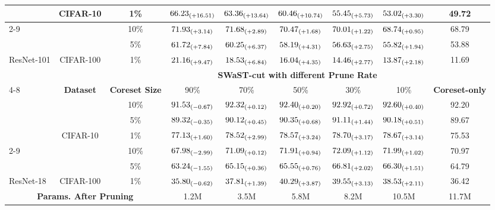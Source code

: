 \begin{table}[!t]
{\begin{tabular}{lcccccccc}
    \multicolumn{1}{c}{} & \multirow{-3}{*}{CIFAR-10} & 1\% & {\color{red}$66.23_{{\tiny(+16.51)}}$} & {\color{blue}$63.36_{{\tiny(+13.64)}}$} & {\color{blue}$60.46_{{\tiny(+10.74)}}$} & $55.45_{{\tiny(+5.73)}}$ & $53.02_{{\tiny(+3.30)}}$ & 49.72 \\ \cline{2-9}   
    \multicolumn{1}{c}{} &  & 10\% & {\color{red}$71.93_{{\tiny(+3.14)}}$} & {\color{blue}$71.68_{{\tiny(+2.89)}}$} & {\color{blue}$70.47_{{\tiny(+1.68)}}$} & $70.01_{{\tiny(+1.22)}}$ & $68.74_{{\tiny(+0.95)}}$ & 68.79 \\
    \multicolumn{1}{c}{} &  & 5\% & {\color{red}$61.72_{{\tiny(+7.84)}}$} & {\color{blue}$60.25_{{\tiny(+6.37)}}$} & {\color{blue}$58.19_{{\tiny(+4.31)}}$} & $56.63_{{\tiny(+2.75)}}$ & $55.82_{{\tiny(+1.94)}}$ & 53.88 \\
    \multirow{-6}{*}{ResNet-101} & \multirow{-3}{*}{CIFAR-100} & 1\% & {\color{red}$21.16_{{\tiny(+9.47)}}$} & {\color{blue}$18.53_{{\tiny(+6.84)}}$} & {\color{blue}\textbf{$16.04_{{\tiny(+4.35)}}$}} & $14.46_{{\tiny(+2.77)}}$ & $13.87_{{\tiny(+2.18)}}$ & 11.69 \\ \hline
    &  &  & \multicolumn{5}{c}{\textbf{SWaST-cut with different Prune Rate}} &  \\ \cline{4-8}  
    \multirow{-2}{*}{\textbf{Model}} & \multirow{-2}{*}{\textbf{Dataset}} & \multirow{-2}{*}{\textbf{Coreset Size}} & 90\% & 70\% & 50\% & 30\% & 10\% & \multirow{-2}{*}{\textbf{Coreset-only}} \\ \hline  
    &  & 10\% & $91.53_{{\tiny(-0.67)}}$ & $92.32_{{\tiny(+0.12)}}$ & {\color{blue}$92.40_{{\tiny(+0.20)}}$} & {\color{red}\textbf{$92.92_{{\tiny(+0.72)}}$}} & {\color{blue}$92.60_{{\tiny(+0.40)}}$} & 92.20 \\
    &  & 5\% & $89.32_{{\tiny(-0.35)}}$ & $90.12_{{\tiny(+0.45)}}$ & {\color{blue}\textbf{$90.35_{{\tiny(+0.68)}}$}} & {\color{red}$91.11_{{\tiny(+1.44)}}$} & {\color{blue}$90.18_{{\tiny(+0.51)}}$} & 89.67 \\
    & \multirow{-3}{*}{CIFAR-10} & 1\% & $77.13_{{\tiny(+1.60)}}$ & $78.52_{{\tiny(+2.99)}}$ & {\color{blue}$78.57_{{\tiny(+3.24)}}$} & {\color{red}\textbf{$78.70_{{\tiny(+3.17)}}$}} & {\color{blue}$78.67_{{\tiny(+3.14)}}$} & 75.53 \\ \cline{2-9}   
    &  & 10\% & $67.98_{{\tiny(-2.99)}}$ & $71.09_{{\tiny(+0.12)}}$ & {\color{blue}$71.91_{{\tiny(+0.94)}}$} & {\color{red}\textbf{$72.09_{{\tiny(+1.12)}}$}} & {\color{blue}$71.99_{{\tiny(+1.02)}}$} & 70.97 \\
    &  & 5\% & $63.24_{{\tiny(-1.55)}}$ & $65.15_{{\tiny(+0.36)}}$ & {\color{blue}$65.55_{{\tiny(+0.76)}}$} & {\color{red}$66.81_{{\tiny(+2.02)}}$} & {\color{blue}\textbf{$66.30_{{\tiny(+1.51)}}$}} & 64.79 \\
    \multirow{-6}{*}{ResNet-18} & \multirow{-3}{*}{CIFAR-100} & 1\% & $35.80_{{\tiny(-0.62)}}$ & $37.81_{{\tiny(+1.39)}}$ & {\color{red}\textbf{$40.29_{{\tiny(+3.87)}}$}} & {\color{blue}$39.55_{{\tiny(+3.13)}}$} & {\color{blue}$38.53_{{\tiny(+2.11)}}$} & 36.42 \\ \hline
    \multicolumn{3}{c}{\textbf{Params. After Pruning}} & 1.2M & 3.5M & 5.8M & 8.2M & 10.5M & 11.7M \\ \hline
    

\end{tabular}}
\end{table}
